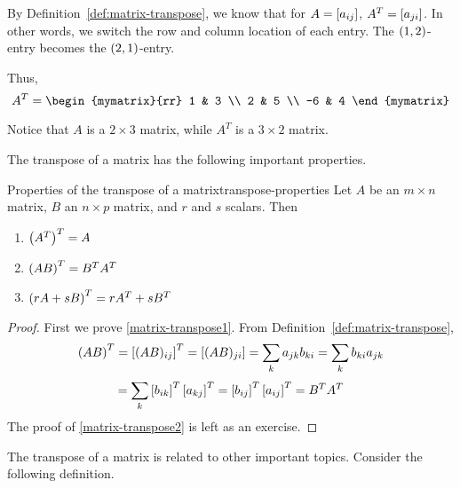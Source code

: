 \begin{solution}
  By Definition~\ref{def:matrix-transpose}, we know that for
  $A = \left[a_{ij} \right]$, $A^T = \left[a_{ji} \right]$. In other words, we
  switch the row and column location of each entry. The
  $\left(1, 2 \right)$-entry becomes the $\left(2,1 \right)$-entry.

  Thus, 
  \begin{equation*}
    A^T = 
    \begin{mymatrix}{rr}
      1 & 3 \\
      2 & 5 \\
      -6 & 4
    \end{mymatrix} 
  \end{equation*}

  Notice that $A$ is a $2 \times 3$ matrix, while $A^T$ is a
  $3 \times 2$ matrix.
\end{solution}

The transpose of a matrix has the following important
properties.

\begin{lemma}{Properties of the transpose of a matrix}{transpose-properties}
  Let $A$ be an $m\times n$ matrix, $B$ an $n\times p$ matrix, and $r$
  and $s$ scalars. Then
  \begin{enumerate}
  \item
    $\left(A^{T}\right)^{T} = A$
  \item
    $\left(AB\right) ^{T}=B^{T}A^{T} $ \label{matrix-transpose1}
  \item
    $\left(rA+ sB\right) ^{T}=rA^{T}+ sB^{T}$  \label{matrix-transpose2}
  \end{enumerate}
\end{lemma}

\begin{proof}
  First we prove \eqref{matrix-transpose1}. From Definition~\ref{def:matrix-transpose},
  \begin{equation*}
    \left(AB\right)^{T} = \left[(AB) _{ij} \right] ^{T}=\left[(AB)_{ji} \right]=\sum_{k}a_{jk}b_{ki}= \sum_{k}b_{ki}a_{jk} 
  \end{equation*}
  \begin{equation*}
    = \sum_{k}\left[b_{ik}\right]^{T}\left[
      a_{kj}\right]^{T}=\left[b_{ij}\right] ^{T} \left[a_{ij}\right]^{T} = B^{T}A^{T} 
  \end{equation*}
  The proof of \eqref{matrix-transpose2} is left as an exercise.
\end{proof}

The transpose of a matrix is related to other important
topics. Consider the following definition.

